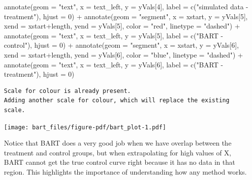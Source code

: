 \documentclass[
  letterpaper,
  DIV=11,
  numbers=noendperiod]{scrreprt}
\newenvironment{Shaded}{\begin{snugshade}}{\end{snugshade}}
\newcommand{\AttributeTok}[1]{\textcolor[rgb]{0.40,0.45,0.13}{#1}}
\newcommand{\DecValTok}[1]{\textcolor[rgb]{0.68,0.00,0.00}{#1}}
\newcommand{\FunctionTok}[1]{\textcolor[rgb]{0.28,0.35,0.67}{#1}}
\newcommand{\NormalTok}[1]{\textcolor[rgb]{0.00,0.23,0.31}{#1}}
\newcommand{\SpecialCharTok}[1]{\textcolor[rgb]{0.37,0.37,0.37}{#1}}
\newcommand{\StringTok}[1]{\textcolor[rgb]{0.13,0.47,0.30}{#1}}
\begin{document}
\begin{Shaded}
\begin{Highlighting}[]
   \FunctionTok{annotate}\NormalTok{(}\AttributeTok{geom =} \StringTok{"text"}\NormalTok{, }\AttributeTok{x =}\NormalTok{ text\_left, }\AttributeTok{y =}\NormalTok{ yVals[}\DecValTok{4}\NormalTok{], }\AttributeTok{label =} \FunctionTok{c}\NormalTok{(}\StringTok{"simulated data {-} treatment"}\NormalTok{), }\AttributeTok{hjust =} \DecValTok{0}\NormalTok{) }\SpecialCharTok{+}
   \FunctionTok{annotate}\NormalTok{(}\AttributeTok{geom =} \StringTok{"segment"}\NormalTok{, }\AttributeTok{x =}\NormalTok{ xstart, }\AttributeTok{y =}\NormalTok{ yVals[}\DecValTok{5}\NormalTok{], }\AttributeTok{xend =}\NormalTok{ xstart}\SpecialCharTok{+}\NormalTok{length, }\AttributeTok{yend =}\NormalTok{ yVals[}\DecValTok{5}\NormalTok{], }\AttributeTok{color =} \StringTok{"red"}\NormalTok{, }\AttributeTok{linetype =} \StringTok{"dashed"}\NormalTok{) }\SpecialCharTok{+}
   \FunctionTok{annotate}\NormalTok{(}\AttributeTok{geom =} \StringTok{"text"}\NormalTok{, }\AttributeTok{x =}\NormalTok{ text\_left, }\AttributeTok{y =}\NormalTok{ yVals[}\DecValTok{5}\NormalTok{], }\AttributeTok{label =} \FunctionTok{c}\NormalTok{(}\StringTok{"BART {-} control"}\NormalTok{), }\AttributeTok{hjust =} \DecValTok{0}\NormalTok{) }\SpecialCharTok{+}
   \FunctionTok{annotate}\NormalTok{(}\AttributeTok{geom =} \StringTok{"segment"}\NormalTok{, }\AttributeTok{x =}\NormalTok{ xstart, }\AttributeTok{y =}\NormalTok{ yVals[}\DecValTok{6}\NormalTok{], }\AttributeTok{xend =}\NormalTok{ xstart}\SpecialCharTok{+}\NormalTok{length, }\AttributeTok{yend =}\NormalTok{ yVals[}\DecValTok{6}\NormalTok{], }\AttributeTok{color =} \StringTok{"blue"}\NormalTok{, }\AttributeTok{linetype =} \StringTok{"dashed"}\NormalTok{) }\SpecialCharTok{+}
   \FunctionTok{annotate}\NormalTok{(}\AttributeTok{geom =} \StringTok{"text"}\NormalTok{, }\AttributeTok{x =}\NormalTok{ text\_left, }\AttributeTok{y =}\NormalTok{ yVals[}\DecValTok{6}\NormalTok{], }\AttributeTok{label =} \FunctionTok{c}\NormalTok{(}\StringTok{"BART {-} treatment"}\NormalTok{), }\AttributeTok{hjust =} \DecValTok{0}\NormalTok{) }
\end{Highlighting}
\end{Shaded}

\begin{verbatim}
Scale for colour is already present.
Adding another scale for colour, which will replace the existing scale.
\end{verbatim}

\texttt{[image: bart\_files/figure-pdf/bart\_plot-1.pdf]}

Notice that BART does a very good job when we have overlap between the
treatment and control groups, but when extrapolating for high values of
X, BART cannot get the true control curve right because it has no data
in that region. This highlights the importance of understanding how any
method works.
\end{document}
